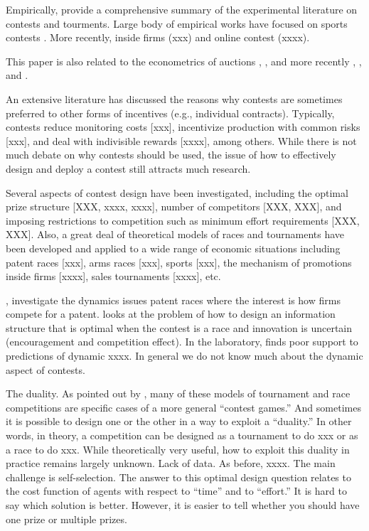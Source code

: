 \documentclass[12pt,]{article}
\begin{document}
Empirically, \citet{dechenaux2014survey} provide a comprehensive summary
of the experimental literature on contests and tourments. Large body of
empirical works have focused on sports contests
\citet{szymanski2003economic}. More recently, inside firms (xxx) and
online contest (xxxx).

This paper is also related to the econometrics of auctions
\citet{paarsch1992deciding}, \citet{laffont1995econometrics},
\citet{donald1996identification} and more recently
\citet{athey2011comparing}, \citet{athey2002identification}, and
\citet{athey2007nonparametric}.

An extensive literature has discussed the reasons why contests are
sometimes preferred to other forms of incentives (e.g., individual
contracts). Typically, contests reduce monitoring costs {[}xxx{]},
incentivize production with common risks {[}xxx{]}, and deal with
indivisible rewards {[}xxxx{]}, among others. While there is not much
debate on why contests should be used, the issue of how to effectively
design and deploy a contest still attracts much research.

Several aspects of contest design have been investigated, including the
optimal prize structure {[}XXX, xxxx, xxxx{]}, number of competitors
{[}XXX, XXX{]}, and imposing restrictions to competition such as minimum
effort requirements {[}XXX, XXX{]}. Also, a great deal of theoretical
models of races and tournaments have been developed and applied to a
wide range of economic situations including patent races {[}xxx{]}, arms
races {[}xxx{]}, sports {[}xxx{]}, the mechanism of promotions inside
firms {[}xxxx{]}, sales tournaments {[}xxxx{]}, etc.

\citet{harris1987racing}, \citet{grossman1987dynamic} investigate the
dynamics issues patent races where the interest is how firms compete for
a patent. \citet{bimpikis2014designing} looks at the problem of how to
design an information structure that is optimal when the contest is a
race and innovation is uncertain (encouragement and competition effect).
In the laboratory, \citet{zizzo2002racing} finds poor support to
predictions of dynamic xxxx. In general we do not know much about the
dynamic aspect of contests.

The duality. As pointed out by \citet{baye2003strategic}, many of these
models of tournament and race competitions are specific cases of a more
general ``contest games.'' And sometimes it is possible to design one or
the other in a way to exploit a ``duality.'' In other words, in theory,
a competition can be designed as a tournament to do xxx or as a race to
do xxx. While theoretically very useful, how to exploit this duality in
practice remains largely unknown. Lack of data. As before, xxxx. The
main challenge is self-selection. The answer to this optimal design
question relates to the cost function of agents with respect to ``time''
and to ``effort.'' It is hard to say which solution is better. However,
it is easier to tell whether you should have one prize or multiple
prizes.
\end{document}

